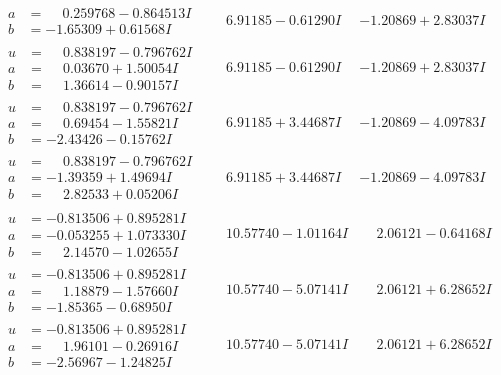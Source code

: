 \documentclass[1p]{elsarticle_modified}
\theoremstyle{definition}
\begin{document}
$$\begin{array}{c|c|c}
\begin{aligned}
a &= \phantom{-}0.259768 - 0.864513 I \\
b &= -1.65309 + 0.61568 I\end{aligned}
 & \phantom{-}6.91185 - 0.61290 I & -1.20869 + 2.83037 I \\ \hline\begin{aligned}
u &= \phantom{-}0.838197 - 0.796762 I \\
a &= \phantom{-}0.03670 + 1.50054 I \\
b &= \phantom{-}1.36614 - 0.90157 I\end{aligned}
 & \phantom{-}6.91185 - 0.61290 I & -1.20869 + 2.83037 I \\ \hline\begin{aligned}
u &= \phantom{-}0.838197 - 0.796762 I \\
a &= \phantom{-}0.69454 - 1.55821 I \\
b &= -2.43426 - 0.15762 I\end{aligned}
 & \phantom{-}6.91185 + 3.44687 I & -1.20869 - 4.09783 I \\ \hline\begin{aligned}
u &= \phantom{-}0.838197 - 0.796762 I \\
a &= -1.39359 + 1.49694 I \\
b &= \phantom{-}2.82533 + 0.05206 I\end{aligned}
 & \phantom{-}6.91185 + 3.44687 I & -1.20869 - 4.09783 I \\ \hline\begin{aligned}
u &= -0.813506 + 0.895281 I \\
a &= -0.053255 + 1.073330 I \\
b &= \phantom{-}2.14570 - 1.02655 I\end{aligned}
 & \phantom{-}10.57740 - 1.01164 I & \phantom{-}2.06121 - 0.64168 I \\ \hline\begin{aligned}
u &= -0.813506 + 0.895281 I \\
a &= \phantom{-}1.18879 - 1.57660 I \\
b &= -1.85365 - 0.68950 I\end{aligned}
 & \phantom{-}10.57740 - 5.07141 I & \phantom{-}2.06121 + 6.28652 I \\ \hline\begin{aligned}
u &= -0.813506 + 0.895281 I \\
a &= \phantom{-}1.96101 - 0.26916 I \\
b &= -2.56967 - 1.24825 I\end{aligned}
 & \phantom{-}10.57740 - 5.07141 I & \phantom{-}2.06121 + 6.28652 I \\ \hline\begin{aligned}

\end{aligned}
\end{array}$$
\end{document}
